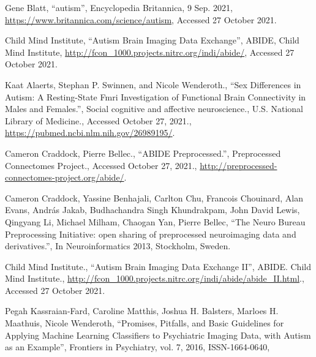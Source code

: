 \begin{thebibliography}{9}

Gene Blatt,
``autism'',
Encyclopedia Britannica,
9 Sep. 2021,
\url{https://www.britannica.com/science/autism},
Accessed 27 October 2021.

Child Mind Institute,
``Autism Brain Imaging Data Exchange'',
ABIDE,
Child Mind Institute,
\url{http://fcon_1000.projects.nitrc.org/indi/abide/},
Accessed 27 October 2021.

Kaat Alaerts, Stephan P. Swinnen, and Nicole Wenderoth.,
``Sex Differences in Autism: A Resting-State Fmri Investigation of Functional Brain Connectivity in Males and Females.'',
Social cognitive and affective neuroscience.,
U.S. National Library of Medicine.,
Accessed October 27, 2021.,
\url{https://pubmed.ncbi.nlm.nih.gov/26989195/}.

Cameron Craddock, Pierre Bellec.,
``ABIDE Preprocessed.'',
Preprocessed Connectomes Project.,
Accessed October 27, 2021.,
\url{http://preprocessed-connectomes-project.org/abide/}.

Cameron Craddock, Yassine Benhajali, Carlton Chu, Francois Chouinard, Alan Evans, András Jakab, Budhachandra Singh Khundrakpam, John David Lewis, Qingyang Li, Michael Milham, Chaogan Yan, Pierre Bellec,
``The Neuro Bureau Preprocessing Initiative: open sharing of preprocessed neuroimaging data and derivatives.'',
In Neuroinformatics 2013,
Stockholm, Sweden.

Child Mind Institute.,
``Autism Brain Imaging Data Exchange II'',
ABIDE. Child Mind Institute., \url{http://fcon_1000.projects.nitrc.org/indi/abide/abide_II.html}.,
Accessed 27 October 2021.

Pegah Kassraian-Fard, Caroline Matthis, Joshua H. Balsters, Marloes H. Maathuis, Nicole Wenderoth,
``Promises, Pitfalls, and Basic Guidelines for Applying Machine Learning Classifiers to Psychiatric Imaging Data, with Autism as an Example'',
Frontiers in Psychiatry,
vol. 7,
2016,
ISSN-1664-0640,









\end{thebibliography}